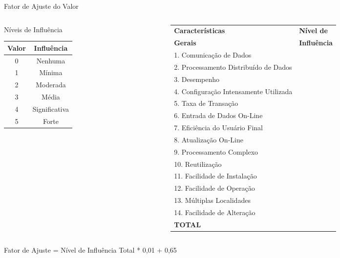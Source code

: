 \begin{frame}{Fator de Ajuste do Valor}\scriptsize
  
  \begin{columns}
    \begin{column}{.3\textwidth}
      Níveis de Influência
      \smallskip
      \begin{tabular}[ht]{|c|c|}\hline
        \bf Valor & Influência \\\hline
        0 & Nenhuma \\
        1 & Mínima \\
        2 & Moderada \\
        3 & Média \\
        4 & Significativa \\
        5 & Forte \\\hline
      \end{tabular}
    \end{column}
    \begin{column}{.7\textwidth}
      \begin{tabular}[ht]{l|l}\hline\hline
        \bf \hfil Características  & \bf\hfil  Nível  de\\
        \bf \hfil Gerais & \bf \hfil Influência \\\hline
        1. Comunicação de Dados & \\
        2. Processamento Distribuído de Dados & \\
        3. Desempenho & \\
        4. Configuração Intensamente Utilizada& \\
        5. Taxa de Transação& \\
        6. Entrada de Dados On-Line& \\
        7. Eficiência do Usuário Final& \\
        8. Atualização On-Line& \\
        9. Processamento Complexo& \\
        10. Reutilização& \\
        11. Facilidade de Instalação& \\
        12. Facilidade de Operação& \\
        13. Múltiplas Localidades& \\
        14. Facilidade de Alteração& \\\hline
        \bf TOTAL & \\\hline\hline
      \end{tabular}
    \end{column}
  \end{columns}

  \begin{center}
    Fator de Ajuste  = Nível de Influência Total * 0,01 + 0,65
  \end{center}
\end{frame}

